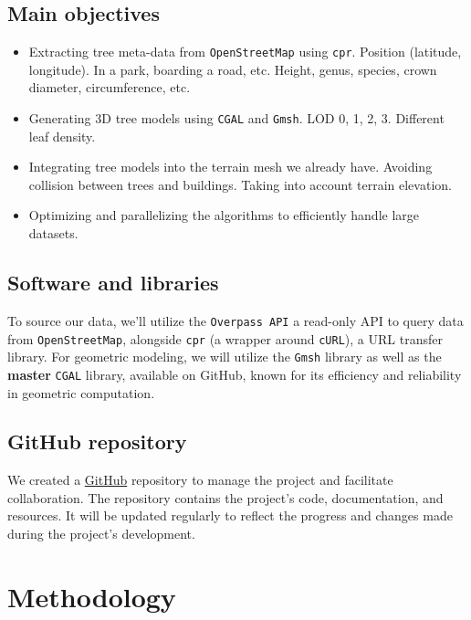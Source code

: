 \documentclass[12pt]{article}
\begin{document}
\subsection{Main objectives}

\begin{itemize}
    \item Extracting tree meta-data from \texttt{OpenStreetMap} using \texttt{cpr}\cite{cpr}.
    \subitem Position (latitude, longitude). In a park, boarding a road, etc.
    \subitem Height, genus, species, crown diameter, circumference, etc.
    \item Generating 3D tree models using \texttt{CGAL}\cite{cgal} and \texttt{Gmsh}\cite{gmsh}.
    \subitem LOD 0, 1, 2, 3.
    \subitem Different leaf density.
    \item Integrating tree models into the terrain mesh we already have.
    \subitem Avoiding collision between trees and buildings.
    \subitem Taking into account terrain elevation.
    \item Optimizing and parallelizing the algorithms to efficiently handle large datasets.
\end{itemize}

\subsection{Software and libraries}
To source our data, we'll utilize the \texttt{Overpass API}\cite{overpass} a
read-only API to query data from \texttt{OpenStreetMap}, alongside
 \texttt{cpr}\cite{cpr} (a wrapper around \texttt{cURL}\cite{curl}), a URL transfer library. For geometric modeling, we
will utilize the \texttt{Gmsh}\cite{gmsh} library as well as the \textbf{master}
 \texttt{CGAL} library, available on
GitHub\cite{cgal-master}, known for its efficiency and reliability in geometric
computation.

\subsection{GitHub repository}
We created a \href{https://github.com/feelpp/ktirio-geom}{GitHub}
repository to manage the project and facilitate collaboration.
The repository contains the project's code, documentation, and resources.
It will be updated regularly to reflect the progress and changes made during
the project's development.


\section{Methodology}
\end{document}
